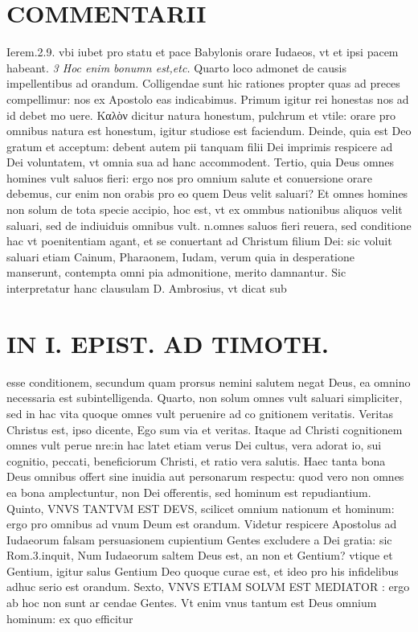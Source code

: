 \documentclass{article}
\begin{document}
\begin{pages}
\section*{COMMENTARII }
\marginpar{[ p.48 ]}\pstart Ierem.2.9. vbi iubet pro statu et pace Babylonis orare Iudaeos, vt et ipsi pacem habeant.  \pend
\textit{3 Hoc enim bonumn est,etc. }\pstart Quarto loco admonet de causis impellentibus ad orandum. Colligendae sunt hic rationes propter quas ad preces compellimur: nos ex Apostolo eas indicabimus. Primum igitur rei honestas nos ad id debet mo uere. Καλὸν dicitur natura honestum, pulchrum et vtile: orare pro omnibus natura est honestum, igitur studiose est faciendum. Deinde, quia est Deo gratum et acceptum: debent autem pii tanquam filii Dei imprimis respicere ad Dei voluntatem, vt omnia sua ad hanc accommodent. Tertio, quia Deus omnes homines vult saluos fieri: ergo nos pro omnium salute et conuersione orare debemus, cur enim non orabis pro eo quem Deus velit saluari? Et omnes homines non solum de tota specie accipio, hoc est, vt ex ommbus  nationibus  aliquos velit saluari, sed de indiuiduis omnibus  vult. n.omnes saluos fieri reuera, sed conditione hac vt poenitentiam agant, et se conuertant ad Christum filium Dei: sic voluit saluari etiam Cainum, Pharaonem, Iudam, verum quia in desperatione manserunt, contempta omni pia admonitione, merito damnantur. Sic interpretatur hanc clausulam D. Ambrosius, vt dicat sub\pend
\section*{IN I. EPIST. AD TIMOTH. }
\marginpar{[ p.49 ]}\pstart esse conditionem, secundum quam prorsus nemini salutem negat Deus, ea omnino necessaria est subintelligenda. Quarto, non solum omnes vult saluari simpliciter, sed in hac vita quoque omnes vult peruenire ad co gnitionem veritatis. Veritas Christus est, ipso dicente, Ego sum via et veritas. Itaque ad Christi cognitionem omnes vult perue nre:in hac latet etiam verus Dei cultus, vera adorat io, sui cognitio, peccati, beneficiorum Christi, et ratio vera salutis. Haec tanta bona Deus omnibus offert sine inuidia aut personarum respectu: quod vero non omnes ea bona amplectuntur, non Dei offerentis, sed hominum est repudiantium.  \pend\pstart Quinto, VNVS TANTVM EST DEVS, scilicet omnium nationum et hominum: ergo pro omnibus ad vnum Deum est orandum. Videtur respicere Apostolus ad Iudaeorum falsam persuasionem cupientium Gentes excludere a Dei gratia: sic Rom.3.inquit, Num Iudaeorum saltem Deus est, an non et Gentium? vtique et Gentium, igitur salus Gentium Deo quoque curae est, et ideo pro his infidelibus adhuc serio est orandum. Sexto, VNVS ETIAM SOLVM EST MEDIATOR : ergo ab hoc non sunt ar cendae Gentes. Vt enim vnus tantum est Deus omnium hominum: ex quo efficitur  \pend

\end{pages}
\end{document}

